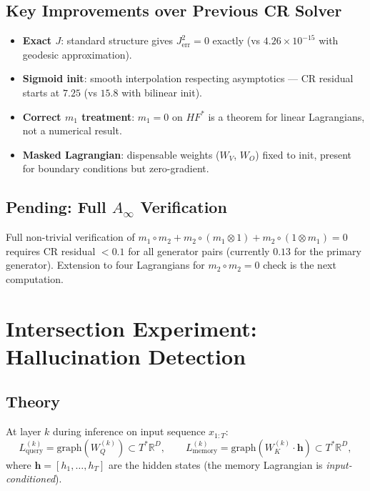 \documentclass[11pt]{amsart}
\begin{document}
\subsection{Key Improvements over Previous CR Solver}

\begin{itemize}
\item \textbf{Exact $J$}: standard structure gives $J^2_\mathrm{err}=0$
  exactly (vs $4.26\times 10^{-15}$ with geodesic approximation).
\item \textbf{Sigmoid init}: smooth interpolation respecting asymptotics
  --- CR residual starts at $7.25$ (vs $15.8$ with bilinear init).
\item \textbf{Correct $m_1$ treatment}: $m_1=0$ on $HF^{*}$ is a theorem
  for linear Lagrangians, not a numerical result.
\item \textbf{Masked Lagrangian}: dispensable weights ($W_V$, $W_O$)
  fixed to init, present for boundary conditions but zero-gradient.
\end{itemize}

\subsection{Pending: Full $A_\infty$ Verification}

Full non-trivial verification of $m_1\circ m_2+m_2\circ(m_1\otimes 1)+m_2\circ(1\otimes m_1)=0$
requires CR residual $<0.1$ for all generator pairs (currently $0.13$ for
the primary generator).
Extension to four Lagrangians for $m_2\circ m_2=0$ check is the next
computation.

\section{Intersection Experiment: Hallucination Detection}
\label{sec:intersection_exp}

\subsection{Theory}

At layer $k$ during inference on input sequence $x_{1:T}$:
\[
  L_\text{query}^{(k)} = \mathrm{graph}(W_Q^{(k)}) \subset T^*\mathbb{R}^D,
  \qquad
  L_\text{memory}^{(k)} = \mathrm{graph}(W_K^{(k)}\cdot\mathbf{h}) \subset T^*\mathbb{R}^D,
\]
where $\mathbf{h} = [h_1,\ldots,h_T]$ are the hidden states
(the memory Lagrangian is \emph{input-conditioned}).
\end{document}
